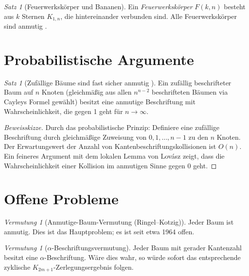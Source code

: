 \documentclass[12pt,a4paper]{amsart}
\theoremstyle{definition}
\theoremstyle{remark}
\newtheorem{satz}[theorem]{Satz}
\newtheorem{vermutung}[theorem]{Vermutung}
\begin{document}
\begin{satz}[Feuerwerkskörper und Bananen]\label{satz:feuerwerk}
Ein \emph{Feuerwerkskörper} $F(k,n)$ besteht aus $k$ Sternen $K_{1,n}$, die
hintereinander verbunden sind. Alle Feuerwerkskörper sind anmutig \cite{Chen1999}.
\end{satz}

\section{Probabilistische Argumente}\label{sec:probabilistisch}

\begin{satz}[Zufällige Bäume sind fast sicher anmutig \cite{Alon1993}]
\label{satz:zufaellig_anmutig}
Ein zufällig beschrifteter Baum auf $n$ Knoten (gleichmäßig aus allen $n^{n-2}$
beschrifteten Bäumen via Cayleys Formel gewählt) besitzt eine anmutige Beschriftung
mit Wahrscheinlichkeit, die gegen 1 geht für $n \to \infty$.
\end{satz}

\begin{proof}[Beweisskizze]
Durch das probabilistische Prinzip: Definiere eine zufällige Beschriftung durch
gleichmäßige Zuweisung von $0, 1, \ldots, n-1$ zu den $n$ Knoten. Der Erwartungswert
der Anzahl von Kantenbeschriftungskollisionen ist $O(n)$. Ein feineres Argument
mit dem lokalen Lemma von Lovász zeigt, dass die Wahrscheinlichkeit einer Kollision
im anmutigen Sinne gegen 0 geht.
\end{proof}

\section{Offene Probleme}\label{sec:offen}

\begin{vermutung}[Anmutige-Baum-Vermutung (Ringel--Kotzig)]\label{verm:abv_haupt}
Jeder Baum ist anmutig. Dies ist das Hauptproblem; es ist seit etwa 1964 offen.
\end{vermutung}

\begin{vermutung}[$\alpha$-Beschriftungsvermutung]\label{verm:alpha}
Jeder Baum mit gerader Kantenzahl besitzt eine $\alpha$-Beschriftung. Wäre dies
wahr, so würde sofort das entsprechende zyklische $K_{2m+1}$-Zerlegungsergebnis
folgen.
\end{vermutung}
\end{document}

